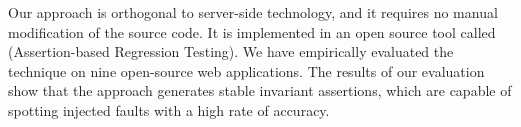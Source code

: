 Our approach is orthogonal to server-side technology, and it requires no manual modification of the source code. It is implemented in an open source tool called \jsart (\javascript Assertion-based Regression Testing).  We have empirically
evaluated the technique on nine open-source web applications. The results of our evaluation show that the approach generates stable invariant assertions, which are capable of spotting injected faults with a high rate of accuracy.
%
